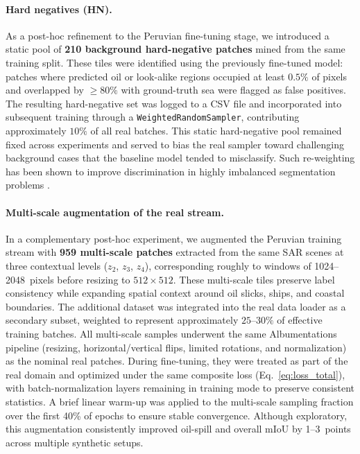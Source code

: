 \documentclass[12pt]{article}
\begin{document}
\paragraph{Hard negatives (HN).}
As a post-hoc refinement to the Peruvian fine-tuning stage, we introduced a static pool of 
\textbf{210 background hard-negative patches} mined from the same training split. 
These tiles were identified using the previously fine-tuned model: 
patches where predicted oil or look-alike regions occupied at least $0.5\%$ of pixels
and overlapped by $\ge80\%$ with ground-truth sea were flagged as false positives. 
The resulting hard-negative set was logged to a CSV file and incorporated into subsequent training 
through a \texttt{WeightedRandomSampler}, contributing approximately $10\%$ of all real batches.
This static hard-negative pool remained fixed across experiments and served to bias the real sampler 
toward challenging background cases that the baseline model tended to misclassify.
Such re-weighting has been shown to improve discrimination in highly imbalanced segmentation problems 
\cite{rs_hardneg_saroptical_2018,dlr_gan_hn_igarss2018,chen2019deeplab_bootstrap,hard_region_mining_2019}.

\paragraph{Multi-scale augmentation of the real stream.}
In a complementary post-hoc experiment, we augmented the Peruvian training stream with 
\textbf{959 multi-scale patches} extracted from the same SAR scenes at three contextual levels 
($z_2$, $z_3$, $z_4$), corresponding roughly to windows of 1024–2048~pixels before resizing to $512{\times}512$. 
These multi-scale tiles preserve label consistency while expanding spatial context around oil slicks,
ships, and coastal boundaries.
The additional dataset was integrated into the real data loader as a secondary subset,
weighted to represent approximately $25\text{–}30\%$ of effective training batches.
All multi-scale samples underwent the same Albumentations pipeline 
(resizing, horizontal/vertical flips, limited rotations, and normalization) as the nominal real patches. 
During fine-tuning, they were treated as part of the real domain 
and optimized under the same composite loss (Eq.~\ref{eq:loss_total}), 
with batch-normalization layers remaining in training mode to preserve consistent statistics.
A brief linear warm-up was applied to the multi-scale sampling fraction 
over the first 40\% of epochs to ensure stable convergence.
Although exploratory, this augmentation consistently improved oil-spill and overall mIoU
by 1–3~points across multiple synthetic setups.
\end{document}
